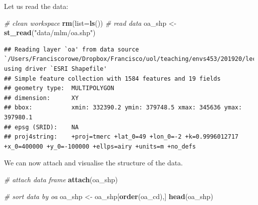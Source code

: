 \documentclass[]{book}
\newenvironment{Shaded}{\begin{snugshade}}{\end{snugshade}}
\newcommand{\KeywordTok}[1]{\textcolor[rgb]{0.13,0.29,0.53}{\textbf{#1}}}
\newcommand{\DataTypeTok}[1]{\textcolor[rgb]{0.13,0.29,0.53}{#1}}
\newcommand{\StringTok}[1]{\textcolor[rgb]{0.31,0.60,0.02}{#1}}
\newcommand{\CommentTok}[1]{\textcolor[rgb]{0.56,0.35,0.01}{\textit{#1}}}
\newcommand{\NormalTok}[1]{#1}
\begin{document}
Let us read the data:

\begin{Shaded}
\begin{Highlighting}[]
\CommentTok{# clean workspace}
\KeywordTok{rm}\NormalTok{(}\DataTypeTok{list=}\KeywordTok{ls}\NormalTok{())}
\CommentTok{# read data}
\NormalTok{oa_shp <-}\StringTok{ }\KeywordTok{st_read}\NormalTok{(}\StringTok{"data/mlm/oa.shp"}\NormalTok{)}
\end{Highlighting}
\end{Shaded}

\begin{verbatim}
## Reading layer `oa' from data source `/Users/Franciscorowe/Dropbox/Francisco/uol/teaching/envs453/201920/lectures/san/data/mlm/oa.shp' using driver `ESRI Shapefile'
## Simple feature collection with 1584 features and 19 fields
## geometry type:  MULTIPOLYGON
## dimension:      XY
## bbox:           xmin: 332390.2 ymin: 379748.5 xmax: 345636 ymax: 397980.1
## epsg (SRID):    NA
## proj4string:    +proj=tmerc +lat_0=49 +lon_0=-2 +k=0.9996012717 +x_0=400000 +y_0=-100000 +ellps=airy +units=m +no_defs
\end{verbatim}

We can now attach and visualise the structure of the data.

\begin{Shaded}
\begin{Highlighting}[]
\CommentTok{# attach data frame}
\KeywordTok{attach}\NormalTok{(oa_shp)}

\CommentTok{# sort data by oa}
\NormalTok{oa_shp <-}\StringTok{ }\NormalTok{oa_shp[}\KeywordTok{order}\NormalTok{(oa_cd),]}
\KeywordTok{head}\NormalTok{(oa_shp)}
\end{Highlighting}
\end{Shaded}
\end{document}
